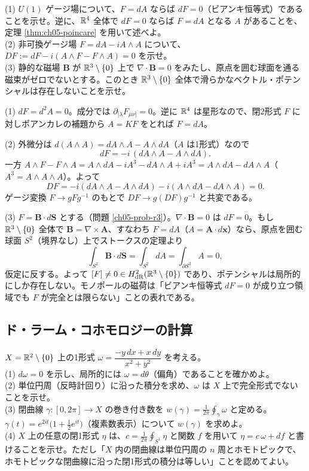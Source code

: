 \begin{problem}[難易度 B]\label{ch05-prob-bianchi}
(1) $U(1)$ ゲージ場について、$F=dA$ ならば $dF=0$（ビアンキ恒等式）であることを示せ。逆に、$\mathbb{R}^4$ 全体で $dF=0$ ならば $F=dA$ となる $A$ があることを、定理 \ref{thm:ch05-poincare} を用いて述べよ。\\
(2) 非可換ゲージ場 $F=dA-iA\wedge A$ について、$DF:=dF-i(A\wedge F-F\wedge A)=0$ を示せ。\\
(3) 静的な磁場 $\bm B$ が $\mathbb{R}^3\setminus\{0\}$ 上で $\nabla\cdot\bm B=0$ をみたし、原点を囲む球面を通る磁束がゼロでないとする。このとき $\mathbb{R}^3\setminus\{0\}$ 全体で滑らかなベクトル・ポテンシャルは存在しないことを示せ。
\end{problem}

\begin{solution}
(1) $dF=d^2A=0$。成分では $\partial_{[\lambda}F_{\mu\nu]}=0$。逆に $\mathbb{R}^4$ は星形なので、閉2形式 $F$ に対しポアンカレの補題から $A=KF$ をとれば $F=dA$。

(2) 外微分は $d(A\wedge A)=dA\wedge A-A\wedge dA$（$A$ は1形式）なので
\[
dF=-i\,(dA\wedge A-A\wedge dA).
\]
一方 $A\wedge F-F\wedge A=A\wedge dA-iA^3-dA\wedge A+iA^3=A\wedge dA-dA\wedge A$（$A^3=A\wedge A\wedge A$）。よって
\[
DF=-i(dA\wedge A-A\wedge dA)-i(A\wedge dA-dA\wedge A)=0 .
\]
ゲージ変換 $F\to gFg^{-1}$ のもとで $DF\to g(DF)g^{-1}$ と共変である。

(3) $F=\bm B\cdot d\bm S$ とする（問題 \ref{ch05-prob-r3}）。$\nabla\cdot\bm B=0$ は $dF=0$。もし $\mathbb{R}^3\setminus\{0\}$ 全体で $\bm B=\nabla\times\bm A$、すなわち $F=dA$（$A=\bm A\cdot d\bm x$）なら、原点を囲む球面 $S^2$（境界なし）上でストークスの定理より
\[
\int_{S^2}\bm B\cdot d\bm S=\int_{S^2}dA=\int_{\partial S^2}A=0 ,
\]
仮定に反する。よって $[F]\neq0\in H^2_{\mathrm{dR}}(\mathbb{R}^3\setminus\{0\})$ であり、ポテンシャルは局所的にしか存在しない。モノポールの磁荷は「ビアンキ恒等式 $dF=0$ が成り立つ領域でも $F$ が完全とは限らない」ことの表れである。
\end{solution}

\subsection{ド・ラーム・コホモロジーの計算}

\begin{problem}[難易度 A]\label{ch05-prob-dtheta}
$X=\mathbb{R}^2\setminus\{0\}$ 上の1形式 $\omega=\dfrac{-y\,dx+x\,dy}{x^2+y^2}$ を考える。\\
(1) $d\omega=0$ を示し、局所的には $\omega=d\theta$（偏角）であることを確かめよ。\\
(2) 単位円周（反時計回り）に沿った積分を求め、$\omega$ は $X$ 上で完全形式でないことを示せ。\\
(3) 閉曲線 $\gamma\colon[0,2\pi]\to X$ の巻き付き数を $w(\gamma)=\frac1{2\pi}\oint_\gamma\omega$ と定める。$\gamma(t)=e^{2it}\bigl(1+\tfrac12e^{it}\bigr)$（複素数表示）について $w(\gamma)$ を求めよ。\\
(4) $X$ 上の任意の閉1形式 $\eta$ は、$c=\frac1{2\pi}\oint_{S^1}\eta$ と関数 $f$ を用いて $\eta=c\,\omega+df$ と書けることを示せ。ただし「$X$ 内の閉曲線は単位円周の $n$ 周とホモトピックで、ホモトピックな閉曲線に沿った閉1形式の積分は等しい」ことを認めてよい。
\end{problem}

